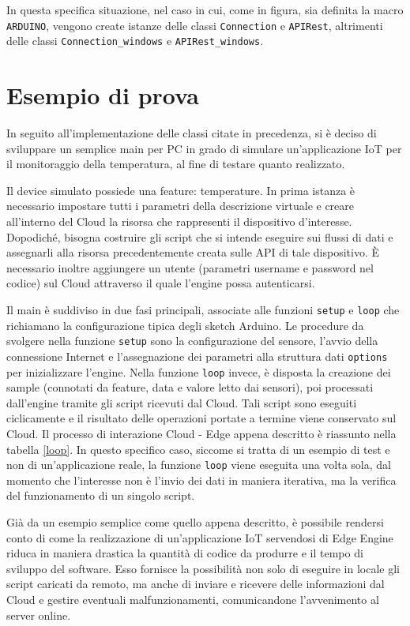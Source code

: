 In questa specifica situazione, nel caso in cui, come in figura, sia definita la macro \texttt{ARDUINO}, vengono create istanze delle classi \texttt{Connection} e \texttt{APIRest}, altrimenti delle classi \texttt{Connection\_windows} e \texttt{APIRest\_windows}.
\section{Esempio di prova}\label{prova}
In seguito all'implementazione delle classi citate in precedenza, si è deciso di sviluppare un semplice main per PC in grado di simulare un’applicazione IoT per il monitoraggio della temperatura, al fine di testare quanto realizzato.

Il device simulato possiede una feature: temperature. In prima istanza è necessario impostare tutti i parametri della descrizione virtuale e creare all'interno del Cloud la risorsa che rappresenti il dispositivo d’interesse. Dopodiché, bisogna costruire gli script che si intende eseguire sui flussi di dati e assegnarli alla risorsa precedentemente creata sulle API di tale dispositivo. È necessario inoltre aggiungere un utente (parametri username e password nel codice) sul Cloud attraverso il quale l'engine possa autenticarsi.

Il main è suddiviso in due fasi principali, associate alle funzioni \texttt{setup} e \texttt{loop} che richiamano la configurazione tipica degli sketch Arduino. Le procedure da svolgere nella funzione \texttt{setup} sono la configurazione del sensore, l'avvio della connessione Internet e l'assegnazione dei parametri alla struttura dati \texttt{options} per inizializzare l'engine. Nella funzione \texttt{loop} invece, è disposta la creazione dei sample (connotati da feature, data e valore letto dai sensori), poi processati dall'engine tramite gli script ricevuti dal Cloud. Tali script sono eseguiti ciclicamente e il risultato delle operazioni portate a termine viene conservato sul Cloud. Il processo di interazione Cloud - Edge appena descritto è riassunto nella tabella \ref{loop}. In questo specifico caso, siccome si tratta di un esempio di test e non di un'applicazione reale, la funzione \texttt{loop} viene eseguita una volta sola, dal momento che l'interesse non è l'invio dei dati in maniera iterativa, ma la verifica del funzionamento di un singolo script.

Già da un esempio semplice come quello appena descritto, è possibile rendersi conto di come la realizzazione di un'applicazione IoT servendosi di Edge Engine riduca in maniera drastica la quantità di codice da produrre e il tempo di sviluppo del software. Esso fornisce la possibilità non solo di eseguire in locale gli script caricati da remoto, ma anche di inviare e ricevere delle informazioni dal Cloud e gestire eventuali malfunzionamenti, comunicandone l'avvenimento al server online.

